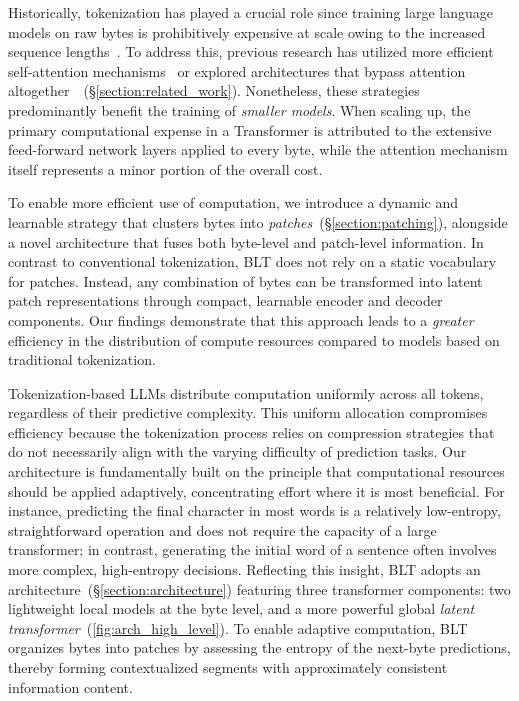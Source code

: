 Historically, tokenization has played a crucial role since training large language models on raw bytes is prohibitively expensive at scale owing to the increased sequence lengths~\citep{xue2022byt5}. To address this, previous research has utilized more efficient self-attention mechanisms~\citep{el2020characterbert, clark2022canine} or explored architectures that bypass attention altogether~\citep{wang2024mambabyte}~(\S\ref{section:related_work}). Nonetheless, these strategies predominantly benefit the training of \textit{smaller models}. When scaling up, the primary computational expense in a Transformer is attributed to the extensive feed-forward network layers applied to every byte, while the attention mechanism itself represents a minor portion of the overall cost.

To enable more efficient use of computation, we introduce a dynamic and learnable strategy that clusters bytes into \textit{patches}~(\S\ref{section:patching}), alongside a novel architecture that fuses both byte-level and patch-level information. In contrast to conventional tokenization, {\textsc BLT} does not rely on a static vocabulary for patches. Instead, any combination of bytes can be transformed into latent patch representations through compact, learnable encoder and decoder components. Our findings demonstrate that this approach leads to a \textit{greater} efficiency in the distribution of compute resources compared to models based on traditional tokenization.

Tokenization-based LLMs distribute computation uniformly across all tokens, regardless of their predictive complexity. This uniform allocation compromises efficiency because the tokenization process relies on compression strategies that do not necessarily align with the varying difficulty of prediction tasks. Our architecture is fundamentally built on the principle that computational resources should be applied adaptively, concentrating effort where it is most beneficial. For instance, predicting the final character in most words is a relatively low-entropy, straightforward operation and does not require the capacity of a large transformer; in contrast, generating the initial word of a sentence often involves more complex, high-entropy decisions. Reflecting this insight, {\textsc BLT} adopts an architecture~(\S\ref{section:architecture}) featuring three transformer components: two lightweight local models at the byte level, and a more powerful global \textit{latent transformer}~(\autoref{fig:arch_high_level}). To enable adaptive computation, {\textsc BLT} organizes bytes into patches by assessing the entropy of the next-byte predictions, thereby forming contextualized segments with approximately consistent information content.


